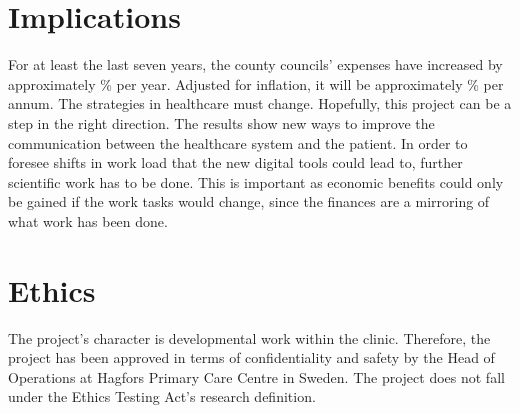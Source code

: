 \documentclass[12pt,a4paper,oneside]{article}
\let\oldcite\cite
\renewcommand*\cite[1]{\textsuperscript{\oldcite{#1}}}
\begin{document}
\section*{Implications}
For at least the last seven years, the county councils' expenses have increased by approximately {}\% per year. Adjusted for inflation, it will be approximately {}\% per annum\cite{numbers3.1, numbers3.2}. The strategies in healthcare must change. Hopefully, this project can be a step in the right direction. The results show new ways to improve the communication between the healthcare system and the patient. 
In order to foresee shifts in work load that the new digital tools could lead to, further scientific work has to be done. This is important as economic benefits could only be gained if the work tasks would change, since the finances are a mirroring of what work has been done.



\section*{Ethics}
The project's character is developmental work within the clinic. 
Therefore, the project has been approved in terms of confidentiality and safety by the Head of Operations at Hagfors Primary Care Centre in Sweden. The project does not fall under the Ethics Testing Act's research definition.
\end{document}
